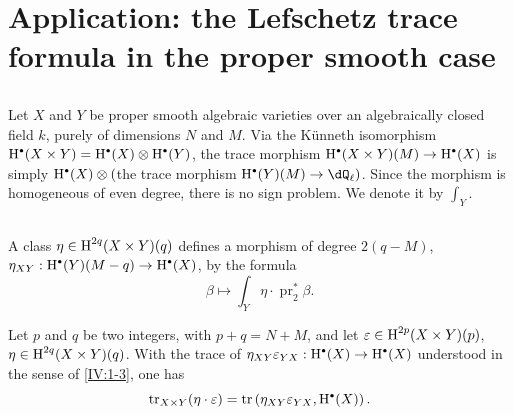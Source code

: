 \section{Application: the Lefschetz trace formula in the proper smooth case}\label{IV:3}






\subsection{}\label{IV:3-1}

Let $X$ and $Y$ be proper smooth algebraic varieties over an algebraically
closed field $k$, purely of dimensions $N$ and $M$. Via the K\"unneth
isomorphism $\h^\bullet(X\times Y)=\h^\bullet(X)\otimes \h^\bullet(Y)$, the
trace morphism $\h^\bullet(X\times Y)(M)\to \h^\bullet(X)$ is simply
$\h^\bullet(X)\otimes ($the trace morphism
$\h^\bullet(Y)(M)\to \dQ_\ell)$. Since the morphism is homogeneous of even
degree, there is no sign problem. We denote it by $\int_Y$.






\subsection{}\label{IV:3-2}

A class $\eta\in \operatorname{H}^{2 q}(X\times Y)(q)$ defines a morphism of degree
$2(q-M)$, $\eta_{XY}:\h^\bullet(Y)(M-q)\to \h^\bullet(X)$, by the formula
\[
  \beta \mapsto \int_Y \eta\cdot \operatorname{pr}_2^\ast \beta \text{.}
\]






\begin{proposition_}\label{IV:3-3}
Let $p$ and $q$ be two integers, with $p+q=N+M$, and let
$\varepsilon\in \operatorname{H}^{2 p}(X\times Y)(p)$,
$\eta\in \operatorname{H}^{2 q}(X\times Y)(q)$. With the trace of
$\eta_{X Y}\varepsilon_{Y X}:\h^\bullet(X)\to \h^\bullet(X)$ understood in
the sense of \ref{IV:1-3}, one has
\[
  \tr_{X\times Y}(\eta\cdot \varepsilon) = \tr\left(\eta_{X Y}\varepsilon_{Y X},\h^\bullet(X)\right) \text{.}
\]
\end{proposition_}

